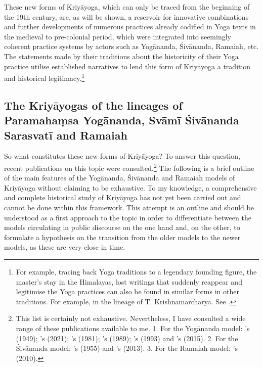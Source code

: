 These new forms of Kriyāyoga, which can only be traced from the beginning of the 19th century, are, as will be shown, a reservoir for innovative combinations and further developments of numerous practices already codified in Yoga texts in the medieval to pre-colonial period, which were integrated into seemingly coherent practice systems by actors such as Yogānanda, Śivānanda, Ramaiah, etc. The statements made by their traditions about the historicity of their Yoga practice utilise established narratives to lend this form of Kriyāyoga a tradition and historical legitimacy.\footnote{For example, tracing back Yoga traditions to a legendary founding figure, the master's stay in the Himalayas, lost writings that suddenly reappear and legitimise the Yoga practices can also be found in similar forms in other traditions. For example, in the lineage of T. Krishnamarcharya. See \citeauthor[2013: 81-121]{singleton2013gurus}.}

\subsection{The Kriyāyogas of the lineages of Paramahaṃsa Yogānanda, Svāmī Śivānanda Sarasvatī and Ramaiah}

So what constitutes these new forms of Kriyāyoga? To answer this question, recent publications on this topic were consulted.\footnote{This list is certainly not exhaustive. Nevertheless, I have consulted a wide range of these publications available to me. 1. For the Yogānanda model: \citeauthor{autobioyogi}'s  (1949); \citeauthor{kriyayogalowenstein}'s  (2021); \citeauthor{kriyayogasarasvati1981}'s  (1981); \citeauthor{hariharananda1989}'s  (1989); \citeauthor{kriyayogaupanishad1993}'s  (1993) and \citeauthor{kriyayogasturgess2015}'s  (2015). 2. For the Śivānanda model: \citeauthor{shivanandakriya1982}'s  (1955) and \citeauthor{kriyayoganityananda2013}'s  (2013). 3. For the Ramaiah model: \citeauthor{govindan2010}'s  (2010).} The following is a brief outline of the main features of the Yogānanda, Śivānanda and Ramaiah models of Kriyāyoga without claiming to be exhaustive. To my knowledge, a comprehensive and complete historical study of Kriyāyoga has not yet been carried out and cannot be done within this framework. This attempt is an outline and should be understood as a first approach to the topic in order to differentiate between the models circulating in public discourse on the one hand and, on the other, to formulate a hypothesis on the transition from the older models to the newer models, as these are very close in time.  

